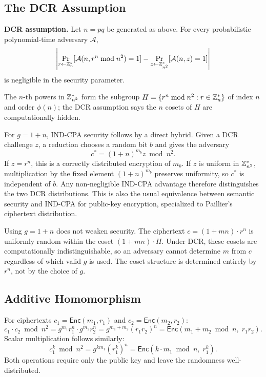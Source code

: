 \subsection{The DCR Assumption}

\begin{tcolorbox}[colback=blue!4!white,colframe=blue!45!black]
  \textbf{DCR assumption.} Let $n=pq$ be generated as above. For every probabilistic polynomial-time adversary $\mathcal A$,
  \[
  \left|
  \Pr_{r\leftarrow\mathbb{Z}_n^*}[\mathcal A(n,r^n\bmod n^2)=1]
  -
  \Pr_{z\leftarrow\mathbb{Z}_{n^2}^*}[\mathcal A(n,z)=1]
  \right|
  \]
  is negligible in the security parameter.
\end{tcolorbox}

The $n$-th powers in $\mathbb{Z}_{n^2}^*$ form the subgroup $H = \{r^n \bmod n^2 : r \in \mathbb{Z}_n^*\}$
of index $n$ and order $\phi(n)$; the DCR assumption says the $n$ cosets of $H$ are
computationally hidden.

For $g=1+n$, IND-CPA security follows by a direct hybrid. Given a DCR challenge $z$, a reduction chooses a random bit $b$ and gives the adversary
\[
c^*=(1+n)^{m_b}z\bmod n^2.
\]
If $z=r^n$, this is a correctly distributed encryption of $m_b$. If $z$ is uniform in $\mathbb{Z}_{n^2}^*$, multiplication by the fixed element $(1+n)^{m_b}$ preserves uniformity, so $c^*$ is independent of $b$. Any non-negligible IND-CPA advantage therefore distinguishes the two DCR distributions. This is also the usual equivalence between semantic security and IND-CPA for public-key encryption, specialized to Paillier's ciphertext distribution.

\begin{remark}[Security with $g = 1+n$]
\label{rem:g-security}
  Using $g = 1+n$ does not weaken security. The ciphertext $c = (1+mn) \cdot r^n$ is
  uniformly random within the coset $(1+mn) \cdot H$. Under DCR, these cosets are
  computationally indistinguishable, so an adversary cannot determine $m$ from $c$
  regardless of which valid $g$ is used. The coset structure is determined entirely by
  $r^n$, not by the choice of $g$.
\end{remark}

\subsection{Additive Homomorphism}

For ciphertexts $c_1 = \mathsf{Enc}(m_1, r_1)$ and $c_2 = \mathsf{Enc}(m_2, r_2)$:
\[
  c_1 \cdot c_2 \bmod n^2
  = g^{m_1} r_1^n \cdot g^{m_2} r_2^n
  = g^{m_1+m_2} (r_1 r_2)^n
  = \mathsf{Enc}(m_1 + m_2 \bmod n,\; r_1 r_2).
\]
Scalar multiplication follows similarly:
\[
  c_1^k \bmod n^2 = g^{km_1}(r_1^k)^n = \mathsf{Enc}(k \cdot m_1 \bmod n,\; r_1^k).
\]
Both operations require only the public key and leave the randomness well-distributed.

